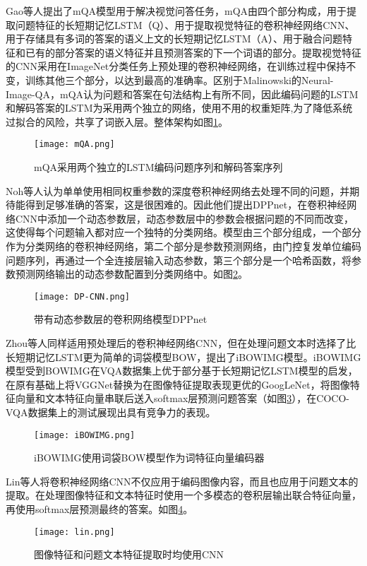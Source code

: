 Gao等人提出了mQA模型用于解决视觉问答任务，mQA由四个部分构成，用于提取问题特征的长短期记忆LSTM（Q）、用于提取视觉特征的卷积神经网络CNN、用于存储具有多词的答案的语义上文的长短期记忆LSTM（A）、用于融合问题特征和已有的部分答案的语义特征并且预测答案的下一个词语的部分。提取视觉特征的CNN采用在ImageNet分类任务上预处理的卷积神经网络，在训练过程中保持不变，训练其他三个部分，以达到最高的准确率。区别于Malinowski的Neural-Image-QA，mQA认为问题和答案在句法结构上有所不同，因此编码问题的LSTM和解码答案的LSTM为采用两个独立的网络，使用不用的权重矩阵,为了降低系统过拟合的风险，共享了词嵌入层。整体架构如图\ref{mQA}。
\begin{figure}[H]
	\centering
	\texttt{[image: mQA.png]}
	\caption{mQA采用两个独立的LSTM编码问题序列和解码答案序列}
	\label{mQA}
\end{figure}

Noh等人认为单单使用相同权重参数的深度卷积神经网络去处理不同的问题，并期待能得到足够准确的答案，这是很困难的。因此他们提出DPPnet，在卷积神经网络CNN中添加一个动态参数层，动态参数层中的参数会根据问题的不同而改变，这使得每个问题输入都对应一个独特的分类网络。模型由三个部分组成，一个部分作为分类网络的卷积神经网络，第二个部分是参数预测网络，由门控复发单位编码问题序列，再通过一个全连接层输入动态参数，第三个部分是一个哈希函数，将参数预测网络输出的动态参数配置到分类网络中。如图\ref{DP-CNN}。
\begin{figure}[H]
	\centering
	\texttt{[image: DP-CNN.png]}
	\caption{带有动态参数层的卷积网络模型DPPnet}
	\label{DP-CNN}
\end{figure}

Zhou等人同样适用预处理后的卷积神经网络CNN，但在处理问题文本时选择了比长短期记忆LSTM更为简单的词袋模型BOW，提出了iBOWIMG模型。iBOWIMG模型受到BOWIMG在VQA数据集上优于部分基于长短期记忆LSTM模型的启发，在原有基础上将VGGNet替换为在图像特征提取表现更优的GoogLeNet，将图像特征向量和文本特征向量串联后送入softmax层预测问题答案（如图\ref{iBOWIMG}），在COCO-VQA数据集上的测试展现出具有竞争力的表现。
\begin{figure}[H]
	\centering
	\texttt{[image: iBOWIMG.png]}
	\caption{iBOWIMG使用词袋BOW模型作为词特征向量编码器}
	\label{iBOWIMG}
\end{figure}

Lin等人将卷积神经网络CNN不仅应用于编码图像内容，而且也应用于问题文本的提取。在处理图像特征和文本特征时使用一个多模态的卷积层输出联合特征向量，再使用softmax层预测最终的答案。如图\ref{lin}。
\begin{figure}[H]
	\centering
	\texttt{[image: lin.png]}
	\caption{图像特征和问题文本特征提取时均使用CNN}
	\label{lin}
\end{figure}

